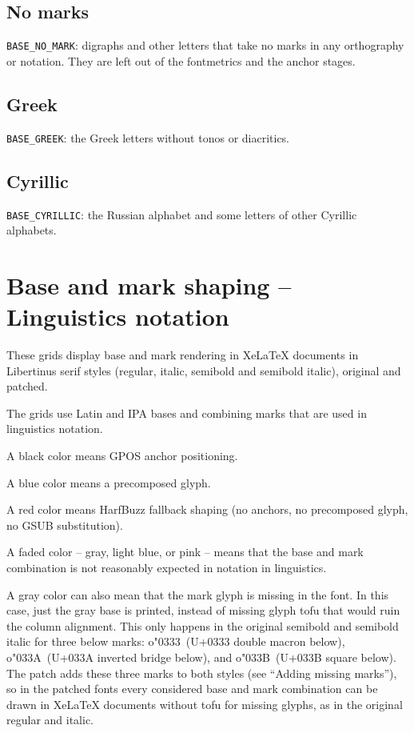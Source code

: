 \documentclass[landscape]{article}
\newcommand{\gs}{\hspace{0.5mm}}	%
\newcommand{\SUPPORTEDANCH}[1]{{\color{supportedanchor}#1}}
\newcommand{\SUPPORTEDPREC}[1]{{\color{supportedprec}#1}}
\newcommand{\SUPPORTEDFALL}[1]{{\color{supportedfall}#1}}
\begin{document}


\subsection*{No marks}

\texttt{BASE\_NO\_MARK}: digraphs and other letters that take no marks in any orthography or notation.
They are left out of the fontmetrics and the anchor stages.



\subsection*{Greek}

\texttt{BASE\_GREEK}: the Greek letters without tonos or diacritics.



\subsection*{Cyrillic}

\texttt{BASE\_CYRILLIC}: the Russian alphabet and some letters of other Cyrillic alphabets.



\newpage
\section*{Base and mark shaping -- Linguistics notation}

These grids display base and mark rendering in XeLaTeX documents in 
Libertinus serif styles (regular, italic, semibold and semibold italic), original and patched.

The grids use Latin and IPA bases and combining marks that are used in linguistics notation.

A \SUPPORTEDANCH{black} color means GPOS anchor positioning.

A \SUPPORTEDPREC{blue} color means a precomposed glyph.

A \SUPPORTEDFALL{red} color means HarfBuzz fallback shaping
(no anchors, no precomposed glyph, no GSUB substitution).

A faded color -- gray, light blue, or pink -- means that the 
base and mark combination is not reasonably expected in notation in linguistics.

A gray color can also mean that the mark glyph is missing in the font.
In this case, just the gray base is printed,
instead of missing glyph tofu that would ruin the column alignment.
This only happens in the original semibold and semibold italic for
three below marks:
o\char"0333\gs\ (U+0333 double macron below),
o\char"033A\gs\ (U+033A inverted bridge below), and
o\char"033B\gs\ (U+033B square below).
The patch adds these three marks to both styles
(see ``Adding missing marks''),
so in the patched fonts every considered base and mark combination
can be drawn in XeLaTeX documents without tofu for missing glyphs,
as in the original regular and italic.
\end{document}
